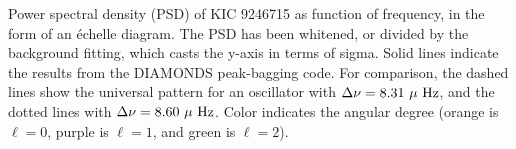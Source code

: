 \label{fig:appendixfig}
Power spectral density (PSD) of KIC 9246715 as function of frequency, in the form of an \'echelle diagram. The PSD has been whitened, or divided by the background fitting, which casts the y-axis in terms of sigma. Solid lines indicate the results from the DIAMONDS peak-bagging code. For comparison, the dashed lines show the universal pattern for an oscillator with $\Delta \nu = 8.31 \ \mu \ \rm{Hz}$, and the dotted lines with $\Delta \nu = 8.60 \ \mu \ \rm{Hz}$. Color indicates the angular degree (orange is $\ell=0$, purple is $\ell=1$, and green is $\ell=2$).